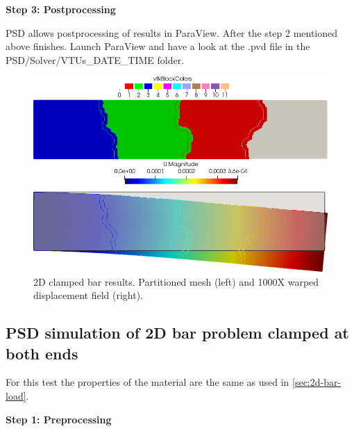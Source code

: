 \documentclass{report}
\begin{document}
\textbf{Step 3: Postprocessing}

PSD allows postprocessing of results in ParaView. After the step 2 mentioned above finishes. Launch ParaView and have a look at the  {\ttfamily .pvd} file in the  {\ttfamily PSD/Solver/VTUs\_DATE\_TIME} folder. 

\begin{figure}[htbp]
    \centering
    \begin{minipage}[t][2cm][t]{0.4\textwidth}
    \includegraphics[align=t,width=1\textwidth]{./Images/2d-bar-partioned.png}
    \end{minipage}\hspace{.1\textwidth}
    \begin{minipage}[t][2cm][t]{0.4\textwidth}
    \includegraphics[align=t,width=1\textwidth]{./Images/2d-bar-results.png}
    \end{minipage}
    \caption{2D clamped bar results. Partitioned mesh (left) and 1000X warped displacement field (right).}
    \label{fig:2d-bar-results}
\end{figure}


\subsection{PSD simulation of 2D bar problem clamped at both ends \label{sec:2D-bar-clamped1}}

For this test the properties of the material are the same as used in \cref{sec:2d-bar-load}. 

\textbf{Step 1: Preprocessing}
\end{document}
